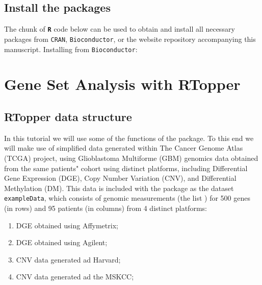 \documentclass[11pt]{article}
\newcommand{\software}[1]{\textsf{\texttt{#1}}}
\newcommand{\R}{\software{\bf R}}
\newcommand{\Bioc}{\software{Bioconductor}}
\newcommand{\Rcode}[1]{{\texttt{\color{BrickRed}{#1}}}}
\renewenvironment{Schunk}{\vspace{\topsep}}{\vspace{\topsep}}
\begin{document}
\subsection{Install the packages}

The chunk of {\R} code below can be used to obtain and install 
all necessary packages from \texttt{CRAN}, {\Bioc}, or the website 
repository accompanying this manuscript.
Installing from {\Bioc}:

\begin{Schunk}
\end{Schunk}

  

\section{Gene Set Analysis with RTopper}

\subsection{RTopper data structure}
In this tutorial we will use some of the functions of the \Rcode{RTopper} package.
To this end we will make use of simplified data generated within 
The Cancer Genome Atlas (TCGA) project,
using Glioblastoma Multiforme (GBM) genomics data obtained from the same
patients" cohort using distinct platforms, including Differential Gene Expression (DGE),
Copy Number Variation (CNV), and Differential Methylation (DM).
This data is included with the \Rcode{RTopper} package as the dataset \texttt{exampleData},
which consists of genomic measurements (the list \Rcode{dat}) 
for 500 genes (in rows) and 95 patients (in columns) from 4 distinct platforms:
\begin{enumerate}
  \item DGE obtained using Affymetrix;
  \item DGE obtained using Agilent;
  \item CNV data generated ad Harvard;
  \item CNV data generated ad the MSKCC;
\end{enumerate}
\end{document}
